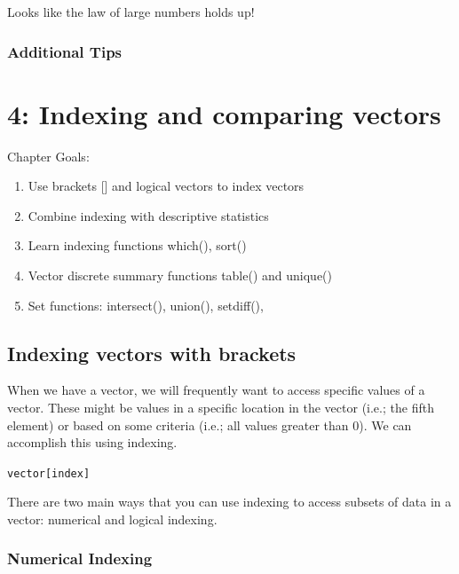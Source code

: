 \documentclass{tufte-book}\usepackage[]{graphicx}\usepackage[]{color}
\newcommand{\newfun}[1]{\begin{LARGE} \begin{center} \texttt{#1} \end{center} \end{LARGE}}
\begin{document}
Looks like the law of large numbers holds up!

\subsection{Additional Tips}



\chapter{4: Indexing and comparing vectors}
\label{ch:4}


Chapter Goals:

\begin{enumerate}
  \item Use brackets [] and logical vectors to index vectors
  \item Combine indexing with descriptive statistics
  \item Learn indexing functions which(), sort()
  \item Vector discrete summary functions table() and unique()
  \item Set functions: intersect(), union(), setdiff(), %
\end{enumerate}


\section{Indexing vectors with brackets}


When we have a vector, we will frequently want to access specific values of a vector. These might be values in a specific location in the vector (i.e.; the fifth element) or based on some criteria (i.e.; all values greater than 0). We can accomplish this using indexing.

\newfun{vector[index]}\index{[]}

There are two main ways that you can use indexing to access subsets of data in a vector: numerical and logical indexing.

\subsection{Numerical Indexing}
\end{document}
